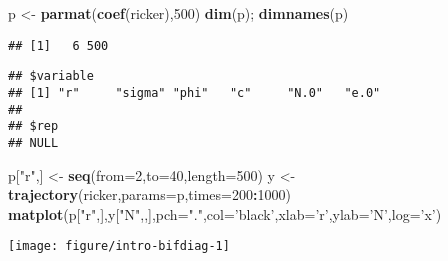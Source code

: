 \documentclass[]{article}
\newenvironment{Shaded}{\begin{snugshade}}{\end{snugshade}}
\newcommand{\KeywordTok}[1]{\textcolor[rgb]{0.13,0.29,0.53}{\textbf{#1}}}
\newcommand{\DataTypeTok}[1]{\textcolor[rgb]{0.13,0.29,0.53}{#1}}
\newcommand{\DecValTok}[1]{\textcolor[rgb]{0.00,0.00,0.81}{#1}}
\newcommand{\StringTok}[1]{\textcolor[rgb]{0.31,0.60,0.02}{#1}}
\newcommand{\OperatorTok}[1]{\textcolor[rgb]{0.81,0.36,0.00}{\textbf{#1}}}
\newcommand{\NormalTok}[1]{#1}
\begin{document}
\begin{Shaded}
\begin{Highlighting}[]
\NormalTok{p <-}\StringTok{ }\KeywordTok{parmat}\NormalTok{(}\KeywordTok{coef}\NormalTok{(ricker),}\DecValTok{500}\NormalTok{)}
\KeywordTok{dim}\NormalTok{(p); }\KeywordTok{dimnames}\NormalTok{(p)}
\end{Highlighting}
\end{Shaded}

\begin{verbatim}
## [1]   6 500
\end{verbatim}

\begin{verbatim}
## $variable
## [1] "r"     "sigma" "phi"   "c"     "N.0"   "e.0"  
## 
## $rep
## NULL
\end{verbatim}

\begin{Shaded}
\begin{Highlighting}[]
\NormalTok{p[}\StringTok{"r"}\NormalTok{,] <-}\StringTok{ }\KeywordTok{seq}\NormalTok{(}\DataTypeTok{from=}\DecValTok{2}\NormalTok{,}\DataTypeTok{to=}\DecValTok{40}\NormalTok{,}\DataTypeTok{length=}\DecValTok{500}\NormalTok{)}
\NormalTok{y <-}\StringTok{ }\KeywordTok{trajectory}\NormalTok{(ricker,}\DataTypeTok{params=}\NormalTok{p,}\DataTypeTok{times=}\DecValTok{200}\OperatorTok{:}\DecValTok{1000}\NormalTok{)}
\KeywordTok{matplot}\NormalTok{(p[}\StringTok{"r"}\NormalTok{,],y[}\StringTok{"N"}\NormalTok{,,],}\DataTypeTok{pch=}\StringTok{"."}\NormalTok{,}\DataTypeTok{col=}\StringTok{'black'}\NormalTok{,}\DataTypeTok{xlab=}\StringTok{'r'}\NormalTok{,}\DataTypeTok{ylab=}\StringTok{'N'}\NormalTok{,}\DataTypeTok{log=}\StringTok{'x'}\NormalTok{)}
\end{Highlighting}
\end{Shaded}

\begin{center}\texttt{[image: figure/intro-bifdiag-1]} \end{center}
\end{document}
